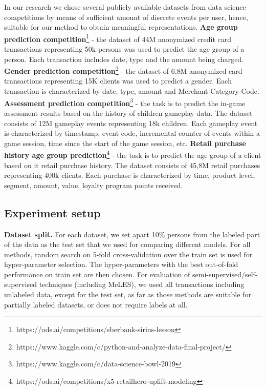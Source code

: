 \documentclass{article}
\begin{document}
In our research we chose several publicly available datasets from data science competitions by means of sufficient amount of discrete events per user, hence, suitable for our method to obtain meaningful representations.
\newline \textbf{Age group prediction competition}\footnote{https://ods.ai/competitions/sberbank-sirius-lesson} - the dataset of 44M anonymized credit card transactions representing 50k persons was used to predict the age group of a person. Each transaction includes date, type and the amount being charged.
\newline \textbf{Gender prediction competition}\footnote{https://www.kaggle.com/c/python-and-analyze-data-final-project/} - the dataset of 6,8M anonymized card transactions representing 15K clients was used to predict a gender. Each transaction is characterized by date, type, amount and Merchant Category Code.
\newline \textbf{Assessment prediction competition}\footnote{https://www.kaggle.com/c/data-science-bowl-2019} - the task is to predict the in-game assessment results based on the history of children gameplay data. The dataset consists of 12M gameplay events representing 18k children. Each gameplay event is characterized by timestamp, event code, incremental counter of events within a game session, time since the start of the game session, etc.
\newline \textbf{Retail purchase history age group prediction}\footnote{https://ods.ai/competitions/x5-retailhero-uplift-modeling} - the task is to predict the age group of a client based on it retail purchase history. The dataset consists of 45,8M retail purchases representing 400k clients. Each purchase is characterized by time, product level, segment, amount, value, loyalty program points received.

\subsection{Experiment setup}

\textbf{Dataset split.} For each dataset, we set apart 10\% persons from the labeled part of the data as the test set that we used for comparing different models.
For all methods, random search on 5-fold cross-validation over the train set is used for hyper-parameter selection. The hyper-parameters with the best out-of-fold performance on train set are then chosen.
For evaluation of semi-supervised/self-supervised techniques (including MeLES), we used all transactions including unlabeled data, except for the test set, as far as those methods are suitable for partially labeled datasets, or does not require labels at all.
\end{document}
